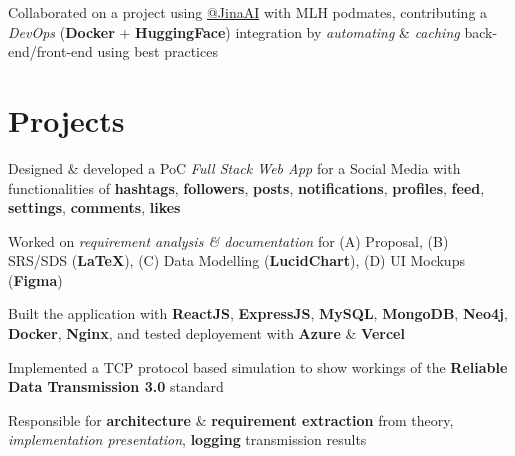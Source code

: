 \documentclass[]{openfont}
\begin{document}
\begin{minipage}[t]{0.65\textwidth}
\begin{tightemize}
    \item Collaborated on a project using \href{https://github.com/georgeamccarthy/protein_search/pull/30}{@JinaAI} with MLH podmates, contributing a \textit{DevOps} (\textbf{Docker} + \textbf{HuggingFace}) integration by \textit{automating} \& \textit{caching} back-end/front-end using best practices    
\end{tightemize}


\section{Projects}
\begin{tightemize}
    \item Designed \& developed a PoC \textit{Full Stack Web App} for a Social Media with functionalities of \textbf{hashtags}, \textbf{followers}, \textbf{posts}, \textbf{notifications}, \textbf{profiles}, \textbf{feed}, \textbf{settings}, \textbf{comments}, \textbf{likes} \\
    
    \item Worked on \textit{requirement analysis \& documentation} for (A) Proposal, (B) SRS/SDS (\textbf{LaTeX}), (C) Data Modelling (\textbf{LucidChart}), (D) UI Mockups (\textbf{Figma}) \\
    
    \item Built the application with \textbf{ReactJS}, \textbf{ExpressJS}, \textbf{MySQL}, \textbf{MongoDB}, \textbf{Neo4j}, \textbf{Docker}, \textbf{Nginx}, and tested deployement with  \textbf{Azure} \& \textbf{Vercel} \\
\end{tightemize}
\sectionsep

\begin{tightemize}
    \item Implemented a TCP protocol based simulation to show workings of the \textbf{Reliable Data Transmission 3.0} standard \\

    \item Responsible for \textbf{architecture} \& \textbf{requirement extraction} from theory, \textit{implementation presentation}, \textbf{logging} transmission results
\end{tightemize}
\sectionsep


\end{minipage}
\end{document}
